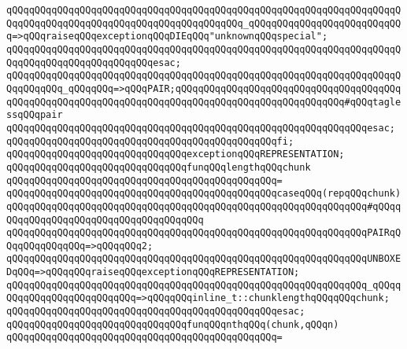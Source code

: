 \verb|qQQqqQQqqQQqqQQqqQQqqQQqqQQqqQQqqQQqqQQqqQQqqQQqqQQqqQQqqQQqqQQqqQQqqQQqqQQqqQQqqQQqqQQqqQQqqQQqqQQqqQQqqQQqqQQq_qQQqqQQqqQQqqQQqqQQqqQQqqQQq=>qQQqraiseqQQqexceptionqQQqDIEqQQq"unknownqQQqspecial";|\newline
\verb|qQQqqQQqqQQqqQQqqQQqqQQqqQQqqQQqqQQqqQQqqQQqqQQqqQQqqQQqqQQqqQQqqQQqqQQqqQQqqQQqqQQqqQQqqQQqqQQqesac;|\newline
\newline
\verb|qQQqqQQqqQQqqQQqqQQqqQQqqQQqqQQqqQQqqQQqqQQqqQQqqQQqqQQqqQQqqQQqqQQqqQQqqQQqqQQq_qQQqqQQq=>qQQqPAIR;qQQqqQQqqQQqqQQqqQQqqQQqqQQqqQQqqQQqqQQqqQQqqQQqqQQqqQQqqQQqqQQqqQQqqQQqqQQqqQQqqQQqqQQqqQQqqQQqqQQq#qQQqtaglessqQQqpair|\newline
\verb|qQQqqQQqqQQqqQQqqQQqqQQqqQQqqQQqqQQqqQQqqQQqqQQqqQQqqQQqqQQqqQQqesac;|\newline
\verb|qQQqqQQqqQQqqQQqqQQqqQQqqQQqqQQqqQQqqQQqqQQqqQQqfi;|\newline
\newline
\verb|qQQqqQQqqQQqqQQqqQQqqQQqqQQqqQQqexceptionqQQqREPRESENTATION;|\newline
\newline
\verb|qQQqqQQqqQQqqQQqqQQqqQQqqQQqqQQqfunqQQqlengthqQQqchunk|\newline
\verb|qQQqqQQqqQQqqQQqqQQqqQQqqQQqqQQqqQQqqQQqqQQqqQQq=|\newline
\verb|qQQqqQQqqQQqqQQqqQQqqQQqqQQqqQQqqQQqqQQqqQQqqQQqcaseqQQq(repqQQqchunk)|\newline
\verb|qQQqqQQqqQQqqQQqqQQqqQQqqQQqqQQqqQQqqQQqqQQqqQQqqQQqqQQqqQQqqQQq#qQQqqQQqqQQqqQQqqQQqqQQqqQQqqQQqqQQqqQQq|\newline
\verb|qQQqqQQqqQQqqQQqqQQqqQQqqQQqqQQqqQQqqQQqqQQqqQQqqQQqqQQqqQQqqQQqPAIRqQQqqQQqqQQqqQQq=>qQQqqQQq2;|\newline
\verb|qQQqqQQqqQQqqQQqqQQqqQQqqQQqqQQqqQQqqQQqqQQqqQQqqQQqqQQqqQQqqQQqUNBOXEDqQQq=>qQQqqQQqraiseqQQqexceptionqQQqREPRESENTATION;|\newline
\verb|qQQqqQQqqQQqqQQqqQQqqQQqqQQqqQQqqQQqqQQqqQQqqQQqqQQqqQQqqQQqqQQq_qQQqqQQqqQQqqQQqqQQqqQQqqQQq=>qQQqqQQqinline_t::chunklengthqQQqqQQqchunk;|\newline
\verb|qQQqqQQqqQQqqQQqqQQqqQQqqQQqqQQqqQQqqQQqqQQqqQQqesac;|\newline
\newline
\newline
\verb|qQQqqQQqqQQqqQQqqQQqqQQqqQQqqQQqfunqQQqnthqQQq(chunk,qQQqn)|\newline
\verb|qQQqqQQqqQQqqQQqqQQqqQQqqQQqqQQqqQQqqQQqqQQqqQQq=|\newline
